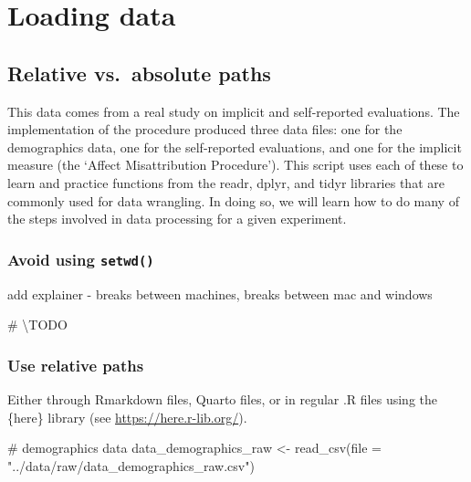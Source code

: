 \documentclass[
  letterpaper,
  DIV=11,
  numbers=noendperiod]{scrreprt}
\newenvironment{Shaded}{\begin{snugshade}}{\end{snugshade}}
\newcommand{\AlertTok}[1]{\textcolor[rgb]{0.68,0.00,0.00}{#1}}
\newcommand{\AttributeTok}[1]{\textcolor[rgb]{0.40,0.45,0.13}{#1}}
\newcommand{\CommentTok}[1]{\textcolor[rgb]{0.37,0.37,0.37}{#1}}
\newcommand{\FunctionTok}[1]{\textcolor[rgb]{0.28,0.35,0.67}{#1}}
\newcommand{\NormalTok}[1]{\textcolor[rgb]{0.00,0.23,0.31}{#1}}
\newcommand{\OtherTok}[1]{\textcolor[rgb]{0.00,0.23,0.31}{#1}}
\newcommand{\StringTok}[1]{\textcolor[rgb]{0.13,0.47,0.30}{#1}}
\begin{document}
\section{Loading data}\label{loading-data-1}

\subsection{Relative vs.~absolute
paths}\label{relative-vs.-absolute-paths}

This data comes from a real study on implicit and self-reported
evaluations. The implementation of the procedure produced three data
files: one for the demographics data, one for the self-reported
evaluations, and one for the implicit measure (the `Affect
Misattribution Procedure'). This script uses each of these to learn and
practice functions from the readr, dplyr, and tidyr libraries that are
commonly used for data wrangling. In doing so, we will learn how to do
many of the steps involved in data processing for a given experiment.

\subsubsection{\texorpdfstring{Avoid using
\texttt{setwd()}}{Avoid using setwd()}}\label{avoid-using-setwd}

\TODO add explainer - breaks between machines, breaks between mac and
windows

\begin{Shaded}
\begin{Highlighting}[]
\CommentTok{\# \textbackslash{}}\AlertTok{TODO}\CommentTok{ }
\end{Highlighting}
\end{Shaded}

\subsubsection{Use relative paths}\label{use-relative-paths}

Either through Rmarkdown files, Quarto files, or in regular .R files
using the \{here\} library (see \url{https://here.r-lib.org/}).

\begin{Shaded}
\begin{Highlighting}[]
\CommentTok{\# demographics data}
\NormalTok{data\_demographics\_raw }\OtherTok{\textless{}{-}} \FunctionTok{read\_csv}\NormalTok{(}\AttributeTok{file =} \StringTok{"../data/raw/data\_demographics\_raw.csv"}\NormalTok{) }
\end{Highlighting}
\end{Shaded}
\end{document}
